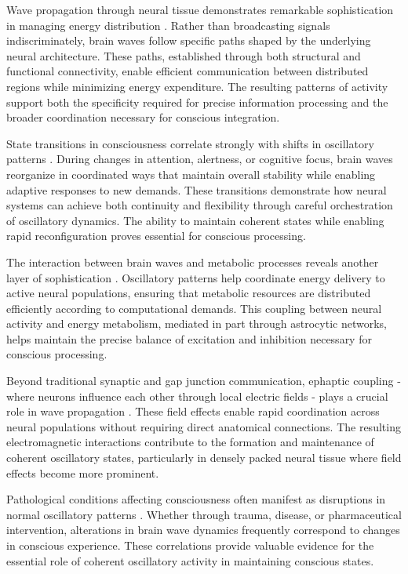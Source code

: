 Wave propagation through neural tissue demonstrates remarkable sophistication in managing energy distribution \cite{Palva2012}. Rather than broadcasting signals indiscriminately, brain waves follow specific paths shaped by the underlying neural architecture. These paths, established through both structural and functional connectivity, enable efficient communication between distributed regions while minimizing energy expenditure. The resulting patterns of activity support both the specificity required for precise information processing and the broader coordination necessary for conscious integration.

State transitions in consciousness correlate strongly with shifts in oscillatory patterns \cite{Singer2018}. During changes in attention, alertness, or cognitive focus, brain waves reorganize in coordinated ways that maintain overall stability while enabling adaptive responses to new demands. These transitions demonstrate how neural systems can achieve both continuity and flexibility through careful orchestration of oscillatory dynamics. The ability to maintain coherent states while enabling rapid reconfiguration proves essential for conscious processing.

The interaction between brain waves and metabolic processes reveals another layer of sophistication \cite{Nyhus2010}. Oscillatory patterns help coordinate energy delivery to active neural populations, ensuring that metabolic resources are distributed efficiently according to computational demands. This coupling between neural activity and energy metabolism, mediated in part through astrocytic networks, helps maintain the precise balance of excitation and inhibition necessary for conscious processing.

Beyond traditional synaptic and gap junction communication, ephaptic coupling - where neurons influence each other through local electric fields - plays a crucial role in wave propagation \cite{Buzsaki2006}. These field effects enable rapid coordination across neural populations without requiring direct anatomical connections. The resulting electromagnetic interactions contribute to the formation and maintenance of coherent oscillatory states, particularly in densely packed neural tissue where field effects become more prominent.

Pathological conditions affecting consciousness often manifest as disruptions in normal oscillatory patterns \cite{Uhlhaas2010}. Whether through trauma, disease, or pharmaceutical intervention, alterations in brain wave dynamics frequently correspond to changes in conscious experience. These correlations provide valuable evidence for the essential role of coherent oscillatory activity in maintaining conscious states.

